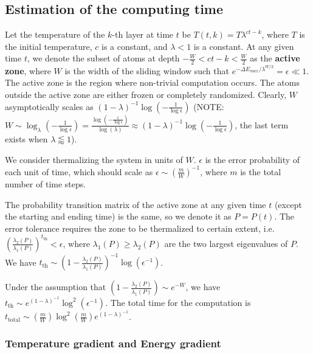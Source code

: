 \documentclass[twocolumn,superscriptaddress,english,showpacs,longbibliography]{revtex4-2}
\begin{document}
\subsection{Estimation of the computing
time}\label{estimation-of-the-computing-time}

Let the temperature of the $k$-th layer at time $t$ be
$T(t, k) = T \lambda^{ct - k}$, where $T$ is the initial
temperature, $c$ is a constant, and $\lambda < 1$ is a constant. At
any given time $t$, we denote the subset of atoms at depth
$-\frac{W}{2} < ct - k < \frac{W}{2}$ as the \textbf{active zone},
where $W$ is the width of the sliding window such that
$e^{-\Delta E_{max} /\lambda^{W/2}} = \epsilon \ll 1$. The active zone
is the region where non-trivial computation occurs. The atoms outside
the active zone are either frozen or completely randomized. Clearly,
$W$ asymptotically scales as
$(1-\lambda)^{-1} \log(-\frac{1}{\log\epsilon})$
(NOTE:$W \sim \log_{\lambda}(-\frac{1}{\log{\epsilon}}) = \frac{\log(-\frac{1}{\log{\epsilon}})}{\log(\lambda)} \approx (1 - \lambda)^{-1}\log(-\frac{1}{\log \epsilon})$,
the last term exists when $\lambda \lessapprox 1$).

We consider thermalizing the system in units of $W$. $\epsilon$ is
the error probability of each unit of time, which should scale as
$\epsilon \sim\left(\frac{m}{W}\right)^{-1}$, where $m$ is the total
number of time steps.

The probability transition matrix of the active zone at any given time
$t$ (except the starting and ending time) is the same, so we denote it
as $P = P(t)$. The error tolerance requires the zone to be thermalized
to certain extent,
i.e.~$\left(\frac{\lambda_2(P)}{\lambda_1(P)}\right)^{t_{\text{th}}} < \epsilon$,
where $\lambda_1(P) \geq \lambda_2(P)$ are the two largest eigenvalues
of $P$. We have
$t_{\text{th}} \sim \left(1-\frac{\lambda_2(P)}{\lambda_1(P)}\right)^{-1}\log(\epsilon^{-1})$.

Under the assumption that
$\left(1-\frac{\lambda_2(P)}{\lambda_1(P)}\right)\sim e^{-W}$, we have
$t_{\text{th}} \sim e^{(1-\lambda)^{-1}}\log^2(\epsilon^{-1})$. The
total time for the computation is
$t_{\text{total}} \sim \left(\frac{m}{W}\right)\log^2(\frac{m}{W}) e^{(1-\lambda)^{-1}}$.

\subsubsection{Temperature gradient and Energy
gradient}\label{temperature-gradient-and-energy-gradient}
\end{document}
